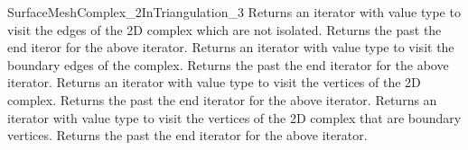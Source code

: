 \begin{ccRefConcept}{SurfaceMeshComplex_2InTriangulation_3}
{Returns an iterator with value type  to visit the
edges of the 2D complex which are not isolated.}
\ccGlue
{}
{Returns the past the end iteror for the above iterator.}
\ccGlue
{}
{Returns an iterator with value type  to visit the
boundary  edges of the complex.}
\ccGlue
{}
{Returns the past the end iterator for the above iterator.}
\ccGlue
{}
{Returns an iterator with value type  to visit the
vertices of the 2D complex.}
\ccGlue
{}
{Returns the past the end iterator for the above iterator.}
\ccGlue
{}
{Returns an iterator with value type  to visit the 
vertices of the 2D complex that are  boundary vertices.}
\ccGlue
{}
{Returns the past the end iterator for the above iterator.}









\end{ccRefConcept}
